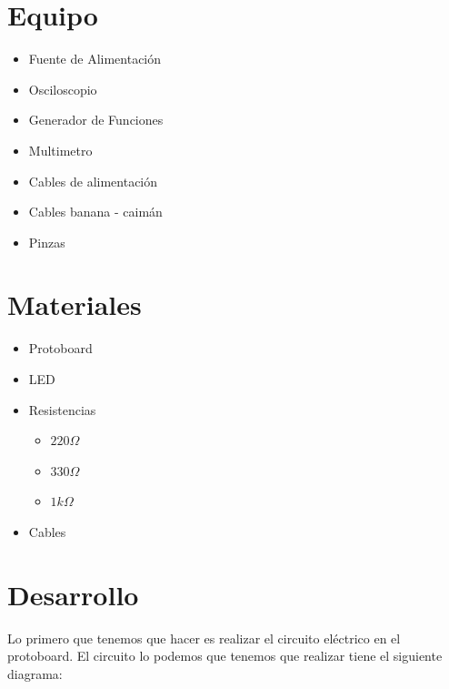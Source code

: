 \documentclass[paper=letter, fontsize=11pt]{scrartcl} %
\numberwithin{equation}{section} %
\numberwithin{figure}{section} %
\numberwithin{table}{section} %
\begin{document}

\section{Equipo}

	\begin{itemize}
		\item Fuente de Alimentación
		\item Osciloscopio
		\item Generador de Funciones
		\item Multimetro
		\item Cables de alimentación
		\item Cables banana - caimán
		\item Pinzas
	\end{itemize}


\section{Materiales}

	\begin{itemize}
		\item Protoboard
		\item LED
		\item Resistencias
		\begin{itemize}
			\item $220 \Omega$
			\item $330 \Omega$
			\item $1 k\Omega$
		\end{itemize}
		\item Cables
	\end{itemize}


\section{Desarrollo}
    Lo primero que tenemos que hacer es realizar el circuito eléctrico en el protoboard. El circuito lo podemos que tenemos que realizar tiene el siguiente diagrama:
\end{document}
